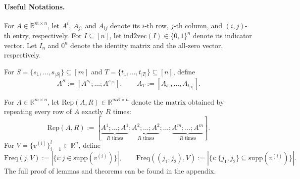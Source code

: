 \documentclass{article}
\newcommand{\xl}[1]{{\color{blue}#1}}
\newcommand{\supp}{\mathrm{supp}}
\begin{document}




\paragraph{Useful Notations.}
For $A\in\mathbb{R}^{m\times n}$, let $A^i$, $A_j$, and $A_{ij}$ denote its $i$-th row, $j$-th column, and $(i,j)$-th entry, respectively. For $I\subseteq[n]$, let $\mathrm{ind2vec}(I)\in\{0,1\}^n$ denote its indicator vector. Let $I_n$ and $0^n$ denote the identity matrix and the all-zero vector, respectively.

For $S=\{s_1,\dots,s_{|S|}\}\subseteq[m]$ and $T=\{t_1,\dots,t_{|T|}\}\subseteq[n]$, define
\[
A^S:=[A^{s_1};\dots;A^{s_{|S|}}],
\qquad
A_T:=[A_{t_1},\dots,A_{t_{|T|}}].
\]

For $A\in\mathbb{R}^{m\times n}$, let $\mathrm{Rep}(A,R)\in\mathbb{R}^{mR\times n}$ denote the matrix obtained by repeating every row of $A$ exactly $R$ times:
\[
\mathrm{Rep}(A,R)
:=
[\underbrace{A^1;\dots;A^1}_{R\text{ times}};
\underbrace{A^2;\dots;A^2}_{R\text{ times}};
\dots;
\underbrace{A^m;\dots;A^m}_{R\text{ times}}].
\]
For $V=\{v^{(i)}\}_{i=1}^l\subset\mathbb{R}^n$, define
\[
\mathrm{Freq}(j,V):=
|\{i:j\in\supp(v^{(i)})\}|,
\qquad
\mathrm{Freq}((j_1,j_2),V):=
|\{i:\{j_1,j_2\}\subseteq\supp(v^{(i)})\}|.
\]
The full proof of lemmas and theorems can be found in the appendix.
\end{document}
